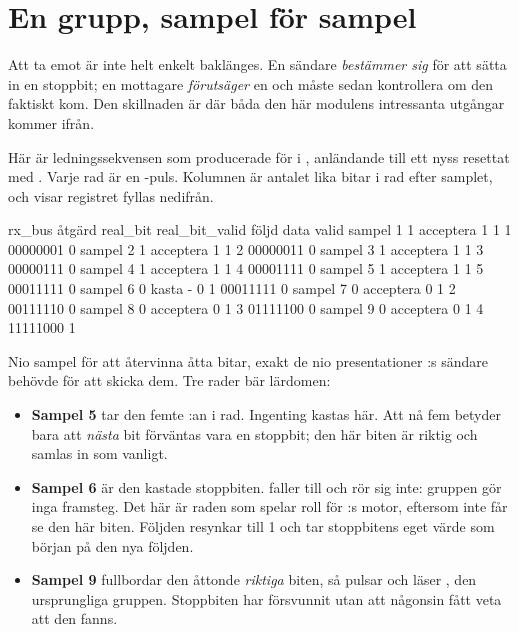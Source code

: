 \section{En grupp, sampel för sampel}
\label{c15:sec:trace}

Att ta emot är inte helt enkelt  baklänges. En sändare \emph{bestämmer sig} för att
sätta in en stoppbit; en mottagare \emph{förutsäger} en och måste sedan kontrollera om den faktiskt
kom. Den skillnaden är där båda den här modulens intressanta utgångar kommer ifrån.

Här är ledningssekvensen som  producerade för  i
, anländande till ett nyss resettat  med
. Varje rad är en -puls. Kolumnen  är antalet lika bitar
i rad efter samplet, och  visar registret fyllas nedifrån.

\begin{textdrawing}
            rx_bus     åtgärd  real_bit  real_bit_valid  följd      data  valid
sampel 1         1  acceptera         1               1     1  00000001      0
sampel 2         1  acceptera         1               1     2  00000011      0
sampel 3         1  acceptera         1               1     3  00000111      0
sampel 4         1  acceptera         1               1     4  00001111      0
sampel 5         1  acceptera         1               1     5  00011111      0
sampel 6         0      kasta         -               0     1  00011111      0
sampel 7         0  acceptera         0               1     2  00111110      0
sampel 8         0  acceptera         0               1     3  01111100      0
sampel 9         0  acceptera         0               1     4  11111000      1
\end{textdrawing}

Nio sampel för att återvinna åtta bitar, exakt de nio presentationer :s sändare
behövde för att skicka dem. Tre rader bär lärdomen:
\begin{itemize}
  \item \textbf{Sampel 5} tar den femte :an i rad. Ingenting kastas här. Att nå fem betyder
    bara att \emph{nästa} bit förväntas vara en stoppbit; den här biten är riktig och samlas in som
    vanligt.
  \item \textbf{Sampel 6} är den kastade stoppbiten.  faller till  och
     rör sig inte: gruppen gör inga framsteg. Det här är raden som spelar roll för
    :s motor, eftersom  inte får se den här biten. Följden resynkar till
    1 och tar stoppbitens eget värde som början på den nya följden.
  \item \textbf{Sampel 9} fullbordar den åttonde \emph{riktiga} biten, så  pulsar och
     läser , den ursprungliga gruppen. Stoppbiten har försvunnit utan att
     någonsin fått veta att den fanns.
\end{itemize}

